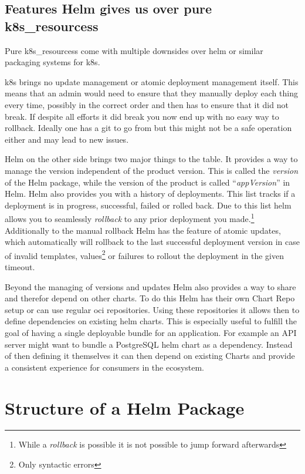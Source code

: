 \documentclass[english]{scrreprt}
\begin{document}
\section{Features Helm gives us over pure \Glspl{k8s_resources}}
Pure \Glspl{k8s_resources} come with multiple downsides over helm or similar packaging systems for \Gls{k8s}.

\Gls{k8s} brings no update management or atomic deployment management itself.
This means that an admin would need to ensure that they manually deploy each thing every time, possibly in the correct order and then has to ensure that it did not break.
If despite all efforts it did break you now end up with no easy way to rollback.
Ideally one has a git to go from but this might not be a safe operation either and may lead to new issues.

Helm on the other side brings two major things to the table.
It provides a way to manage the version independent of the product version.
This is called the \emph{version} of the Helm package, while the version of the product is called \enquote{\emph{appVersion}} in Helm.
Helm also provides you with a history of deployments.
This list tracks if a deployment is in progress, successful, failed or rolled back.
Due to this list helm allows you to seamlessly \emph{rollback} to any prior deployment you made.\footnote{While a \emph{rollback} is possible it is not possible to jump forward afterwards}
Additionally to the manual rollback Helm has the feature of atomic updates, which automatically will rollback to the last successful deployment version in case of invalid templates, values\footnote{Only syntactic errors} or failures to rollout the deployment in the given timeout.

Beyond the managing of versions and updates Helm also provides a way to share and therefor depend on other charts.
To do this Helm has their own Chart Repo setup or can use regular \gls{oci} repositories.
Using these repositories it allows then to define dependencies on existing helm charts.
This is especially useful to fulfill the goal of having a single deployable bundle for an application.
For example an API server might want to bundle a PostgreSQL helm chart as a dependency.
Instead of then defining it themselves it can then depend on existing Charts and provide a consistent experience for consumers in the ecosystem.

\chapter{Structure of a Helm Package}
\end{document}
